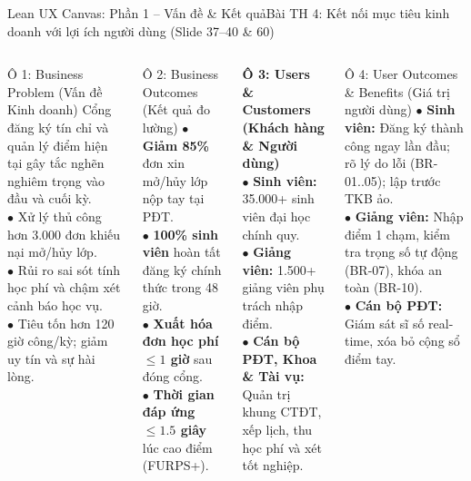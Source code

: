 \documentclass[aspectratio=169, 10pt]{beamer}
\begin{document}
\begin{frame}[t]{Lean UX Canvas: Phần 1 -- Vấn đề \& Kết quả}{Bài TH 4: Kết nối mục tiêu kinh doanh với lợi ích người dùng (Slide 37--40 \& 60)}
  \vspace{-0.25cm}
  \begin{columns}[T]
      \begin{alertCard}{Ô 1: Business Problem (Vấn đề Kinh doanh)}
        \tiny
        Cổng đăng ký tín chỉ và quản lý điểm hiện tại gây tắc nghẽn nghiêm trọng vào đầu và cuối kỳ.\\
        $\bullet$ Xử lý thủ công hơn 3.000 đơn khiếu nại mở/hủy lớp.\\
        $\bullet$ Rủi ro sai sót tính học phí và chậm xét cảnh báo học vụ.\\
        $\bullet$ Tiêu tốn hơn 120 giờ công/kỳ; giảm uy tín và sự hài lòng.
      \end{alertCard}
      \vspace{-0.2cm}
      \begin{infoCard}{Ô 2: Business Outcomes (Kết quả đo lường)}
        \tiny
        $\bullet$ \textbf{Giảm 85\%} đơn xin mở/hủy lớp nộp tay tại PĐT.\\
        $\bullet$ \textbf{100\% sinh viên} hoàn tất đăng ký chính thức trong 48 giờ.\\
        $\bullet$ \textbf{Xuất hóa đơn học phí $\le 1$ giờ} sau đóng cổng.\\
        $\bullet$ \textbf{Thời gian đáp ứng $\le 1.5$ giây} lúc cao điểm (FURPS+).
      \end{infoCard}

      \begin{neutralBox}
        \tiny
        \textbf{\color{PrimaryBlue}Ô 3: Users \& Customers (Khách hàng \& Người dùng)}\\
        $\bullet$ \textbf{Sinh viên:} 35.000+ sinh viên đại học chính quy.\\
        $\bullet$ \textbf{Giảng viên:} 1.500+ giảng viên phụ trách nhập điểm.\\
        $\bullet$ \textbf{Cán bộ PĐT, Khoa \& Tài vụ:} Quản trị khung CTĐT, xếp lịch, thu học phí và xét tốt nghiệp.
      \end{neutralBox}
      \vspace{-0.2cm}
      \begin{accentCard}{Ô 4: User Outcomes \& Benefits (Giá trị người dùng)}
        \tiny
        $\bullet$ \textbf{Sinh viên:} Đăng ký thành công ngay lần đầu; rõ lý do lỗi (BR-01..05); lập trước TKB ảo.\\
        $\bullet$ \textbf{Giảng viên:} Nhập điểm 1 chạm, kiểm tra trọng số tự động (BR-07), khóa an toàn (BR-10).\\
        $\bullet$ \textbf{Cán bộ PĐT:} Giám sát sĩ số real-time, xóa bỏ cộng sổ điểm tay.
      \end{accentCard}
  \end{columns}
\end{frame}
\end{document}
